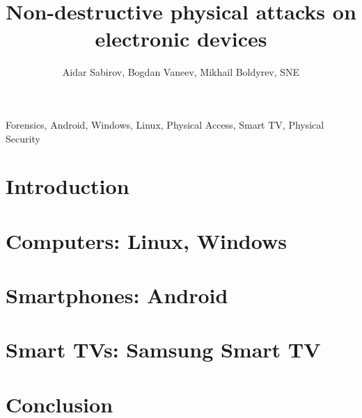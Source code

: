 \documentclass[journal]{IEEEtran}
\begin{document}
\title{Non-destructive physical attacks on electronic devices}
\author{Aidar Sabirov, Bogdan Vaneev, Mikhail Boldyrev, SNE}
%
{}
\maketitle

\begin{abstract}

\end{abstract}

\begin{IEEEkeywords}
Forensics, Android, Windows, Linux, Physical Access, Smart TV, Physical Security
\end{IEEEkeywords}

\IEEEpeerreviewmaketitle



\section{Introduction}


\section{Computers: Linux, Windows}


\section{Smartphones: Android}


\section{Smart TVs: Samsung Smart TV}


\section{Conclusion}


\ifCLASSOPTIONcaptionsoff
  \newpage
\fi


\appendices


\newpage


\end{document}
